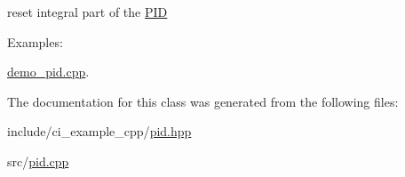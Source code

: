 reset integral part of the \hyperlink{classci__example__cpp_1_1PID}{P\+ID} \begin{Desc}
\item[Examples\+: ]\par
\hyperlink{demo_pid_8cpp-example}{demo\+\_\+pid.\+cpp}.\end{Desc}


The documentation for this class was generated from the following files\+:\begin{DoxyCompactItemize}
\item 
include/ci\+\_\+example\+\_\+cpp/\hyperlink{pid_8hpp}{pid.\+hpp}\item 
src/\hyperlink{pid_8cpp}{pid.\+cpp}\end{DoxyCompactItemize}
